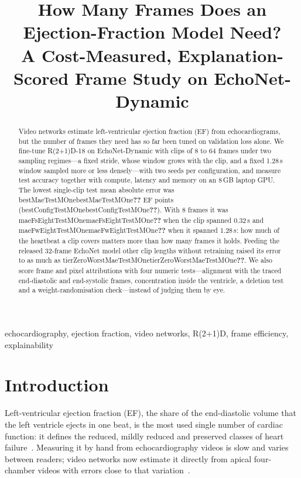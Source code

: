 \documentclass[conference]{IEEEtran}
\newcommand{\res}[1]{\ifcsname #1\endcsname\csname #1\endcsname\else\textbf{??}\fi}
\begin{document}
\title{How Many Frames Does an Ejection-Fraction Model Need?\\
A Cost-Measured, Explanation-Scored Frame Study on EchoNet-Dynamic}

\author{
}

\maketitle

\begin{abstract}
Video networks estimate left-ventricular ejection fraction (EF) from echocardiograms, but the
number of frames they need has so far been tuned on validation loss alone. We fine-tune
R(2+1)D-18 on EchoNet-Dynamic with clips of 8 to 64 frames under two sampling regimes---a fixed
stride, whose window grows with the clip, and a fixed 1.28\,s window sampled more or less
densely---with two seeds per configuration, and measure test accuracy together with compute,
latency and memory on an 8\,GB laptop GPU. The lowest single-clip test mean absolute error was
\res{bestMaeTestMOne} EF points (\res{bestConfigTestMOne}). With 8 frames it was
\res{maeFsEightTestMOne} when the clip spanned 0.32\,s and \res{maeFwEightTestMOne} when it
spanned 1.28\,s:
how much of the heartbeat a clip covers matters more than how many frames it holds. Feeding the
released 32-frame EchoNet model other clip lengths without retraining raised its error to as much
as \res{tierZeroWorstMaeTestMOne}. We also score frame and pixel attributions with four numeric
tests---alignment with the traced end-diastolic and end-systolic frames, concentration inside the
ventricle, a deletion test and a weight-randomisation check---instead of judging them by eye.
\end{abstract}

\begin{IEEEkeywords}
echocardiography, ejection fraction, video networks, R(2+1)D, frame efficiency, explainability
\end{IEEEkeywords}

\section{Introduction}
Left-ventricular ejection fraction (EF), the share of the end-diastolic volume that the left
ventricle ejects in one beat, is the most used single number of cardiac function: it defines
the reduced, mildly reduced and preserved classes of heart failure~\cite{bozkurt2021universal}.
Measuring it by hand from echocardiography videos is slow and varies between readers; video
networks now estimate it directly from apical four-chamber videos with errors close to that
variation~\cite{ouyang2020nature}.
\end{document}
